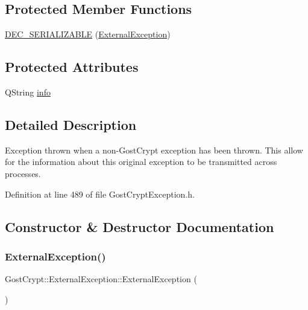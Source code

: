 \subsection*{Protected Member Functions}
\begin{DoxyCompactItemize}
\item 
\hyperlink{class_gost_crypt_1_1_external_exception_a434d8574852605de036496e9a2640d42}{D\+E\+C\+\_\+\+S\+E\+R\+I\+A\+L\+I\+Z\+A\+B\+LE} (\hyperlink{class_gost_crypt_1_1_external_exception}{External\+Exception})
\end{DoxyCompactItemize}
\subsection*{Protected Attributes}
\begin{DoxyCompactItemize}
\item 
Q\+String \hyperlink{class_gost_crypt_1_1_external_exception_ab26b2883a39100eff9612c77de420eec}{info}
\end{DoxyCompactItemize}


\subsection{Detailed Description}
Exception thrown when a non-\/\+Gost\+Crypt exception has been thrown. This allow for the information about this original exception to be transmitted across processes. 

Definition at line 489 of file Gost\+Crypt\+Exception.\+h.



\subsection{Constructor \& Destructor Documentation}
\mbox{\label{class_gost_crypt_1_1_external_exception_ad8a723481e9e8990ba3b7c88010c1ef4}} 
\subsubsection{\texorpdfstring{External\+Exception()}{ExternalException()}\hspace{0.1cm}{\footnotesize\ttfamily [1/2]}}
{\footnotesize\ttfamily Gost\+Crypt\+::\+External\+Exception\+::\+External\+Exception (\begin{DoxyParamCaption}{ }\end{DoxyParamCaption})\hspace{0.3cm}{\ttfamily [inline]}}




